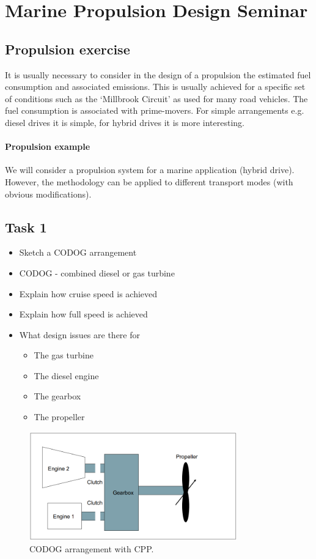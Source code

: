 \chapter{Marine Propulsion Design Seminar}
\section{Propulsion exercise}
It is usually necessary to consider in the design of a propulsion the estimated fuel consumption and associated emissions. This is usually achieved for a specific set of conditions such as the `Millbrook Circuit' as used for many road vehicles. The fuel consumption is associated with prime-movers. For simple arrangements e.g. diesel drives it is simple, for hybrid drives it is more interesting.
\subsubsection{Propulsion example}
We will consider a propulsion system for a marine application (hybrid drive). However, the methodology can be applied to different transport modes (with obvious modifications).
\section{Task 1}
\begin{itemize}
    \item Sketch a CODOG arrangement
    \item CODOG - combined diesel or gas turbine
    \item Explain how cruise speed is achieved
    \item Explain how full speed is achieved
    \item What design issues are there for
          \begin{itemize}
              \item The gas turbine
              \item The diesel engine
              \item The gearbox
              \item The propeller
          \end{itemize}
\end{itemize}
\begin{figure}[H]
    \centering
    \includegraphics[width = 0.8\textwidth]{img/figure70.png}
    \caption{CODOG arrangement with CPP.}
\end{figure}

